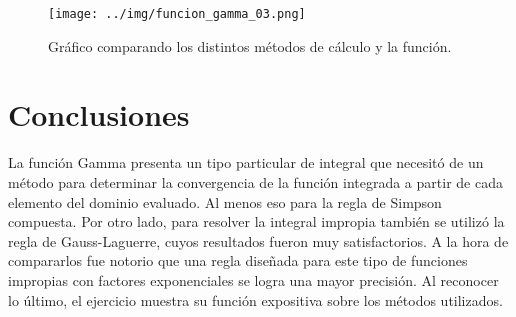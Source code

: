 \documentclass[../portafolio.tex]{subfiles}
\begin{document}
\begin{figure}
\centering
\texttt{[image: ../img/funcion\_gamma\_03.png]} 
\caption{Gráfico comparando los distintos métodos de cálculo y la función.}\label{g3_ej10:fig:gam2}
\end{figure}
\section*{Conclusiones}
La función Gamma presenta un tipo particular de integral que necesitó de un método para determinar la convergencia de la función integrada a partir de cada elemento del dominio evaluado. Al menos eso para la regla de Simpson compuesta. Por otro lado, para resolver la integral impropia también se utilizó la regla de Gauss-Laguerre, cuyos resultados fueron muy satisfactorios. A la hora de compararlos fue notorio que una regla diseñada para este tipo de funciones impropias con factores exponenciales se logra una mayor precisión. Al reconocer lo último, el ejercicio muestra su función expositiva sobre los métodos utilizados.
\end{document}
